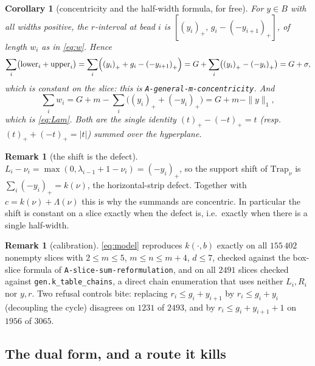 \documentclass[11pt]{article}
\theoremstyle{plain}
\newtheorem{corollary}[theorem]{Corollary}
\theoremstyle{definition}
\newtheorem{remark}[theorem]{Remark}
\newcommand{\Trap}{\mathrm{Trap}}
\newcommand{\pp}[1]{\left(#1\right)_{+}}
\begin{document}
\begin{corollary}[concentricity and the half-width formula, for free]\label{cor:free}
For $y\in B$ with all widths positive, the $r$-interval at bead $i$ is
$[\pp{y_i},\,g_i-\pp{-y_{i+1}}]$, of length $w_i$ as in \eqref{eq:w}. Hence
\[
  \sum_i\bigl(\text{lower}_i+\text{upper}_i\bigr)
  =\sum_i\Bigl(\pp{y_i}+g_i-\pp{-y_{i+1}}\Bigr)
  =G+\sum_i\bigl(\pp{y_i}-\pp{-y_i}\bigr)=G+\sigma ,
\]
which is constant on the slice: this is \texttt{A-general-m-concentricity}. And
\[
  \sum_iw_i=G+m-\sum_i\bigl(\pp{y_i}+\pp{-y_i}\bigr)=G+m-\|y\|_1 ,
\]
which is \eqref{eq:Lam}. Both are the single identity $\pp{t}-\pp{-t}=t$ (resp.\
$\pp{t}+\pp{-t}=|t|$) summed over the hyperplane.
\end{corollary}

\begin{remark}[the shift is the defect]\label{rem:shift}
$L_i-\nu_i=\max(0,\lambda_{i-1}+1-\nu_i)=\pp{-y_i}$, so the support shift of $\Trap_\nu$
is $\sum_i\pp{-y_i}=k(\nu)$, the horizontal-strip defect. Together with
$c=k(\nu)+\Lambda(\nu)$ this is why the summands are concentric. In particular the shift
is constant on a slice exactly when the defect is, i.e.\ exactly when there is a single
half-width.
\end{remark}

\begin{remark}[calibration]\label{rem:calib}
\eqref{eq:model} reproduces $k(\cdot,b)$ exactly on all $155\,402$ nonempty slices with
$2\le m\le5$, $m\le n\le m+4$, $d\le7$, checked against the box-slice formula of
\texttt{A-slice-sum-reformulation}, and on all $2491$ slices checked against
\texttt{gen.k\_table\_chains}, a direct chain enumeration that uses neither $L_i,R_i$ nor
$y,r$. Two refusal controls bite: replacing $r_i\le g_i+y_{i+1}$ by $r_i\le g_i+y_i$
(decoupling the cycle) disagrees on $1231$ of $2493$, and by $r_i\le g_i+y_{i+1}+1$ on
$1956$ of $3065$.
\end{remark}

\subsection*{The dual form, and a route it kills}
\end{document}

